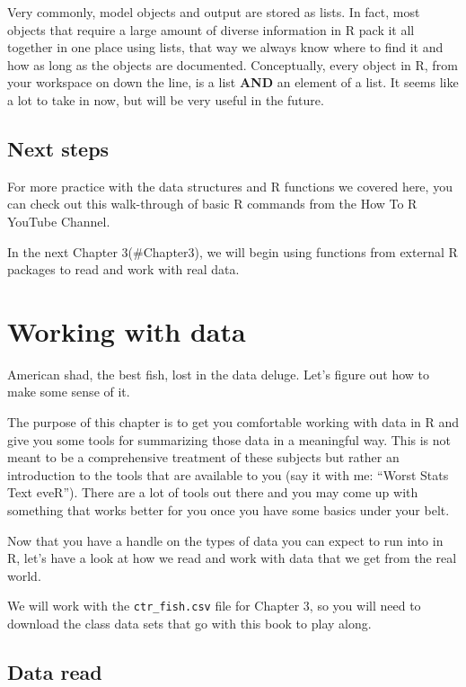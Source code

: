 \documentclass[
]{book}
\begin{document}
Very commonly, model objects and output are stored as lists. In fact, most objects that require a large amount of diverse information in R pack it all together in one place using lists, that way we always know where to find it and how as long as the objects are documented. Conceptually, every object in R, from your workspace on down the line, is a list \textbf{AND} an element of a list. It seems like a lot to take in now, but will be very useful in the future.

\hypertarget{next-steps}{%
\section{Next steps}\label{next-steps}}

For more practice with the data structures and R functions we covered here, you can check out this walk-through of basic R commands from the How To R YouTube Channel.

In the next Chapter 3(\#Chapter3), we will begin using functions from external R packages to read and work with real data.

\hypertarget{Chapter3}{%
\chapter{Working with data}\label{Chapter3}}

American shad, the best fish, lost in the data deluge. Let's figure out how to make some sense of it.

The purpose of this chapter is to get you comfortable working with data in R and give you some tools for summarizing those data in a meaningful way. This is not meant to be a comprehensive treatment of these subjects but rather an introduction to the tools that are available to you (say it with me: ``Worst Stats Text eveR''). There are a lot of tools out there and you may come up with something that works better for you once you have some basics under your belt.

Now that you have a handle on the types of data you can expect to run into in R, let's have a look at how we read and work with data that we get from the real world.

We will work with the \texttt{ctr\_fish.csv} file for Chapter 3, so you will need to download the class data sets that go with this book to play along.

\hypertarget{data-read}{%
\section{Data read}\label{data-read}}
\end{document}

